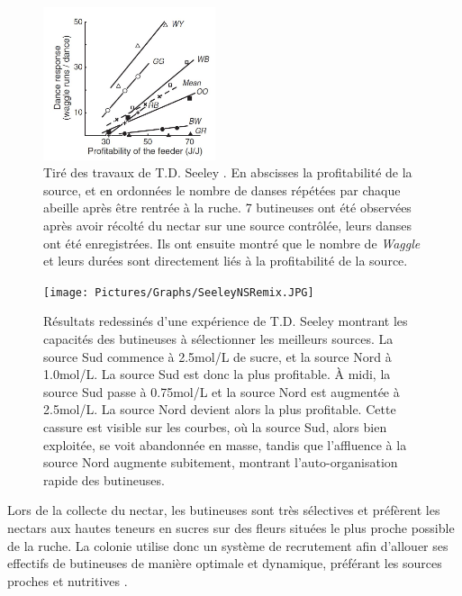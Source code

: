 			
	\begin{figure}
	\centering
	\includegraphics[width=0.45\textwidth]{Pictures/Graphs/SeeleyWaggles.JPG}
	\caption[Tiré des travaux de T.D. Seeley \cite{seeley_wisdom_1995}. En abscisses la profitabilité de la source, et en ordonnées le nombre de 8 (de \textit{Waggle}) réalisés par chaque abeilles par danse après être rentrée à la ruche.]{Tiré des travaux de T.D. Seeley \cite{seeley_wisdom_1995}. En abscisses la profitabilité de la source, et en ordonnées le nombre de danses répétées par chaque abeille après être rentrée à la ruche. 7 butineuses ont été observées après avoir récolté du nectar sur une source contrôlée, leurs danses ont été enregistrées. Ils ont ensuite montré que le nombre de \textit{Waggle} et leurs durées sont directement liés à la profitabilité de la source.}
	\label{SeeleyWaggles}
	\end{figure}
			
			\begin{figure}
			\centering
			\texttt{[image: Pictures/Graphs/SeeleyNSRemix.JPG]}
				\caption[Résultats redessinés d'une expérience de T.D. Seeley \cite{seeley_collective_1991} montrant les capacités des butineuses à sélectionner les meilleurs sources.]{Résultats redessinés d'une expérience de T.D. Seeley \cite{seeley_collective_1991} montrant les capacités des butineuses à sélectionner les meilleurs sources. La source Sud commence à 2.5mol/L de sucre, et la source Nord à 1.0mol/L. La source Sud est donc la plus profitable. À midi, la source Sud passe à 0.75mol/L et la source Nord est augmentée à 2.5mol/L. La source Nord devient alors la plus profitable. Cette cassure est visible sur les courbes, où la source Sud, alors bien exploitée, se voit abandonnée en masse, tandis que l’affluence à la source Nord augmente subitement, montrant l’auto-organisation rapide des butineuses.}
			\label{SeeleyNS}
			\end{figure}
	
			
			
			Lors de la collecte du nectar, les butineuses sont très sélectives et préfèrent les nectars aux hautes teneurs en sucres sur des fleurs situées le plus proche possible de la ruche. La colonie utilise donc un système de recrutement afin d'allouer ses effectifs de butineuses de manière optimale et dynamique, préférant les sources proches et nutritives \cite{riviere_modemulti-agent_2021}.
	
